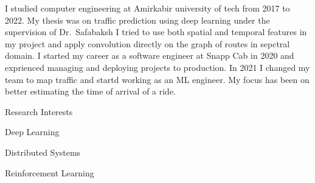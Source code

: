 

\begin{cvparagraph}
I studied computer engineering at Amirkabir university of tech from 2017 to 2022.
My thesis was on traffic prediction using deep learning under the supervision of
Dr.~Safabaksh I tried to use both spatial and temporal features in my project and apply
convolution directly on the graph of routes in sepctral domain.
I started my career as a software engineer at Snapp Cab in 2020
and exprienced managing and deploying projects to production.
In 2021 I changed my team to map traffic and startd working as an ML engineer.
My focus has been on better estimating the time of arrival of a ride.

\vspace{5mm}

  \cventry
    {}
    {Research Interests}
    {}
    {}
    {
      \begin{cvitems}
        \item {Deep Learning}
        \item {Distributed Systems}
        \item {Reinforcement Learning}
      \end{cvitems}
    }

\end{cvparagraph}
